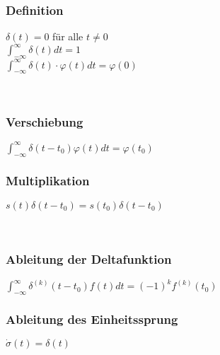 
\subsubsection[Definition]{Definition}
\begin{minipage}{0.3\textwidth}
		\begin{framed}
			\centering
			$\delta(t)=0$ für alle $t \neq 0$\\
			$\int_{-\infty}^{\infty} \delta(t) d t=1$\\
			$\int_{-\infty}^{\infty} \delta(t) \cdot \varphi(t) d t=\varphi(0)$
		\end{framed}
\end{minipage}\\[10pt]
%
\begin{minipage}{0.5\textwidth}
	\subsubsection{Verschiebung}
	$\int_{-\infty}^{\infty} \delta\left(t-t_{0}\right) \varphi(t) d t=\varphi\left(t_{0}\right)$
\end{minipage}
%
\begin{minipage}{0.5\textwidth}
	\subsubsection{Multiplikation}
	$s(t) \delta\left(t-t_{0}\right)=s\left(t_{0}\right) \delta\left(t-t_{0}\right)$
\end{minipage}\\[10pt]
%
\begin{minipage}{0.5\textwidth}
	\subsubsection{Ableitung der Deltafunktion}
	$\int_{-\infty}^{\infty} \delta^{(k)}\left(t-t_{0}\right) f(t) d t=(-1)^{k} f^{(k)}\left(t_{0}\right)$
\end{minipage}
\begin{minipage}{0.5\textwidth}
	\subsubsection{Ableitung des Einheitssprung}
	$\dot{\sigma}(t)=\delta(t)$
\end{minipage}
